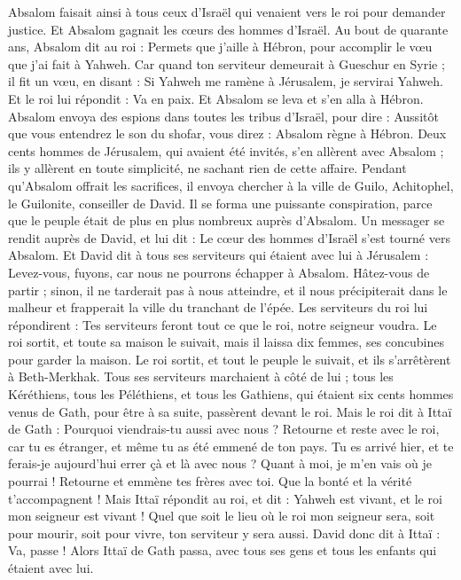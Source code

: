 \begin{multicols}{2}
Absalom faisait ainsi à tous ceux d'Israël qui venaient vers le roi pour demander justice. Et Absalom gagnait les cœurs des hommes d'Israël.
Au bout de quarante ans, Absalom dit au roi : Permets que j’aille à Hébron, pour accomplir le vœu que j'ai fait à Yahweh.
Car quand ton serviteur demeurait à Gueschur en Syrie ; il fit un vœu, en disant : Si Yahweh me ramène à Jérusalem, je servirai Yahweh.
Et le roi lui répondit : Va en paix. Et Absalom se leva et s'en alla à Hébron.
Absalom envoya des espions dans toutes les tribus d'Israël, pour dire : Aussitôt que vous entendrez le son du shofar, vous direz : Absalom règne à Hébron.
Deux cents hommes de Jérusalem, qui avaient été invités, s'en allèrent avec Absalom ; ils y allèrent en toute simplicité, ne sachant rien de cette affaire.
Pendant qu’Absalom offrait les sacrifices, il envoya chercher à la ville de Guilo, Achitophel, le Guilonite, conseiller de David. Il se forma une puissante conspiration, parce que le peuple était de plus en plus nombreux auprès d’Absalom.
Un messager se rendit auprès de David, et lui dit : Le cœur des hommes d’Israël s’est tourné vers Absalom.
Et David dit à tous ses serviteurs qui étaient avec lui à Jérusalem : Levez-vous, fuyons, car nous ne pourrons échapper à Absalom. Hâtez-vous de partir ; sinon, il ne tarderait pas à nous atteindre, et il nous précipiterait dans le malheur et frapperait la ville du tranchant de l’épée.
Les serviteurs du roi lui répondirent : Tes serviteurs feront tout ce que le roi, notre seigneur voudra.
Le roi sortit, et toute sa maison le suivait, mais il laissa dix femmes, ses concubines pour garder la maison.
Le roi sortit, et tout le peuple le suivait, et ils s'arrêtèrent à Beth-Merkhak.
Tous ses serviteurs marchaient à côté de lui ; tous les Kéréthiens, tous les Péléthiens, et tous les Gathiens, qui étaient six cents hommes venus de Gath, pour être à sa suite, passèrent devant le roi.
Mais le roi dit à Ittaï de Gath : Pourquoi viendrais-tu aussi avec nous ? Retourne et reste avec le roi, car tu es étranger, et même tu as été emmené de ton pays.
Tu es arrivé hier, et te ferais-je aujourd'hui errer çà et là avec nous ? Quant à moi, je m’en vais où je pourrai ! Retourne et emmène tes frères avec toi. Que la bonté et la vérité t’accompagnent !
Mais Ittaï répondit au roi, et dit : Yahweh est vivant, et le roi mon seigneur est vivant ! Quel que soit le lieu où le roi mon seigneur sera, soit pour mourir, soit pour vivre, ton serviteur y sera aussi.
David donc dit à Ittaï : Va, passe ! Alors Ittaï de Gath passa, avec tous ses gens et tous les enfants qui étaient avec lui.

\end{multicols}
